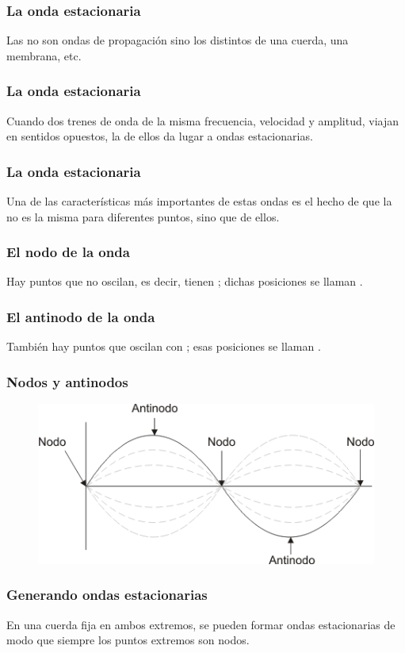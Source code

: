 \documentclass[14pt]{beamer}
\begin{document}
\begin{frame}
\frametitle{La onda estacionaria}
Las  no son ondas de propagación sino los distintos  de una cuerda, una membrana, etc.
\end{frame}
\begin{frame}
\frametitle{La onda estacionaria}
Cuando dos trenes de onda de la misma frecuencia, velocidad y amplitud, \pause viajan en sentidos opuestos, la  de ellos da lugar a ondas estacionarias.
\end{frame}
\begin{frame}
\frametitle{La onda estacionaria}
Una de las características más importantes de estas ondas es el hecho de que la  no es la misma para diferentes puntos, \pause sino que  de ellos.
\end{frame}
\begin{frame}
\frametitle{El nodo de la onda}
Hay puntos que no oscilan, es decir, tienen ; \pause dichas posiciones se llaman .
\end{frame}
\begin{frame}
\frametitle{El antinodo de la onda}
También hay puntos que oscilan con ; esas posiciones se llaman .
\end{frame}
\begin{frame}
\frametitle{Nodos y antinodos}
\begin{figure}
    \centering
    \includegraphics[scale=0.6]{Imagenes/Onda_Estacionaria_01.png}
\end{figure}
\end{frame}
\begin{frame}
\frametitle{Generando ondas estacionarias}
En una cuerda fija en ambos extremos, se pueden formar ondas estacionarias de modo que siempre los puntos extremos son nodos. 
\end{frame}
\end{document}
